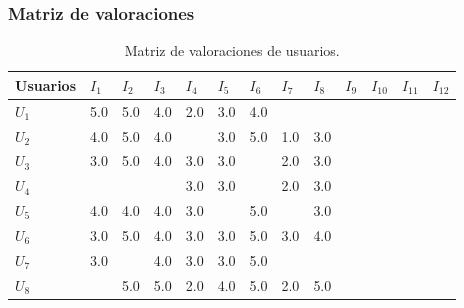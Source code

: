 \documentclass[12pt,letterpaper,oneside] {memoir}
\begin{document}
\subsubsection{Matriz de valoraciones}

\begin{table}[H]
	\caption{Matriz de valoraciones de usuarios.} \begin{center}
\linespread{0.9}\selectfont
\renewcommand {\arraystretch}{0.5}
\begin{tabular}{>{\footnotesize}p{0.4in}>{\footnotesize}p{0.2in}>{\footnotesize}p{0.2in}>{\footnotesize}p{0.2in}>{\footnotesize}p{0.2in}>{\footnotesize}p{0.2in}>{\footnotesize}p{0.2in}>{\footnotesize}p{0.2in}>{\footnotesize}p{0.2in}>{\footnotesize}p{0.2in}>{\footnotesize}p{0.2in}>{\footnotesize}p{0.2in}>{\footnotesize}p{0.2in}}
\hline   
 {\tiny Usuarios} &  {\tiny $I_1$} &  {\tiny $I_2$} &   {\tiny $I_3$} &   {\tiny $I_4$} &  {\tiny $I_5$} &  {\tiny $I_6$} &   {\tiny $I_7$} &  {\tiny  $I_8$ }&  {\tiny  $I_9$} & {\tiny  $I_{10}$} & {\tiny  $I_{11}$} &  {\tiny $I_{12}$}\\
\hline           
 {\tiny $U_1$} & {\tiny 5.0} & {\tiny 5.0}  & {\tiny 4.0}  & {\tiny 2.0}  & {\tiny 3.0}  & {\tiny 4.0}  &  &  &  &  &  & \\
 {\tiny $U_2$} &  {\tiny 4.0} &  {\tiny 5.0}  &  {\tiny 4.0}  &  &  {\tiny 3.0}  &  {\tiny 5.0}  &  {\tiny 1.0}  &  {\tiny 3.0}  &  &  &  & \\
 {\tiny $U_3$} &  {\tiny 3.0}  &  {\tiny 5.0}  & {\tiny 4.0}  &  {\tiny 3.0}  &  {\tiny 3.0}  &  &  {\tiny 2.0}  &  {\tiny 3.0}  &  &  &  & \\
 {\tiny $U_4$} &  &  &  &  {\tiny 3.0}  &  {\tiny 3.0}  &  &  {\tiny 2.0}  &  {\tiny 3.0}  &  &  &  & \\
 {\tiny $U_5$} &  {\tiny 4.0}  &  {\tiny 4.0}  &  {\tiny 4.0}  &  {\tiny 3.0}  &  &  {\tiny 5.0}  &  &  {\tiny 3.0}  &  &  &  & \\
 {\tiny $U_6$} &  {\tiny 3.0}  &  {\tiny 5.0}  &  {\tiny 4.0}  &  {\tiny 3.0}  &  {\tiny 3.0}  &  {\tiny 5.0}  &  {\tiny 3.0}  &  {\tiny 4.0}  &  &  &  & \\
 {\tiny $U_7$} &  {\tiny 3.0}  &  &  {\tiny 4.0}  &  {\tiny 3.0}  &  {\tiny 3.0}  &  {\tiny 5.0}  &  &  &  &  &  & \\
 {\tiny $U_8$} &  &  {\tiny 5.0}  &  {\tiny 5.0}  &  {\tiny 2.0}  &  {\tiny 4.0}  &  {\tiny 5.0}  &  {\tiny 2.0}  &  {\tiny 5.0}  &  &  &  & \\

\end{tabular}
\end{center}
\end{table}
\end{document}
